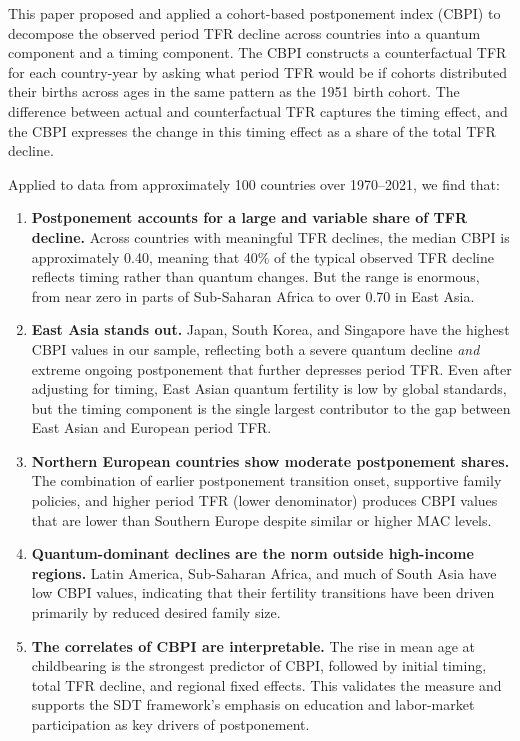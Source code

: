 \documentclass[12pt]{article}
\begin{document}
This paper proposed and applied a cohort-based postponement index (CBPI)
to decompose the observed period TFR decline across countries into a
quantum component and a timing component.  The CBPI constructs a
counterfactual TFR for each country-year by asking what period TFR
would be if cohorts distributed their births across ages in the same
pattern as the 1951 birth cohort.  The difference between actual and
counterfactual TFR captures the timing effect, and the CBPI expresses
the change in this timing effect as a share of the total TFR decline.

Applied to data from approximately 100 countries over 1970--2021,
we find that:

\begin{enumerate}
    \item \textbf{Postponement accounts for a large and variable share
    of TFR decline.}  Across countries with meaningful TFR declines,
    the median CBPI is approximately 0.40, meaning that 40\% of the
    typical observed TFR decline reflects timing rather than quantum
    changes.  But the range is enormous, from near zero in parts of
    Sub-Saharan Africa to over 0.70 in East Asia.

    \item \textbf{East Asia stands out.}  Japan, South Korea, and
    Singapore have the highest CBPI values in our sample, reflecting
    both a severe quantum decline \emph{and} extreme ongoing postponement
    that further depresses period TFR.  Even after adjusting for timing,
    East Asian quantum fertility is low by global standards, but the
    timing component is the single largest contributor to the gap
    between East Asian and European period TFR.

    \item \textbf{Northern European countries show moderate postponement
    shares.}  The combination of earlier postponement transition onset,
    supportive family policies, and higher period TFR (lower denominator)
    produces CBPI values that are lower than Southern Europe despite
    similar or higher MAC levels.

    \item \textbf{Quantum-dominant declines are the norm outside
    high-income regions.}  Latin America, Sub-Saharan Africa, and much
    of South Asia have low CBPI values, indicating that their fertility
    transitions have been driven primarily by reduced desired family size.

    \item \textbf{The correlates of CBPI are interpretable.}  The rise
    in mean age at childbearing is the strongest predictor of CBPI,
    followed by initial timing, total TFR decline, and regional
    fixed effects.  This validates the measure and supports the SDT
    framework's emphasis on education and labor-market participation as
    key drivers of postponement.
\end{enumerate}
\end{document}

